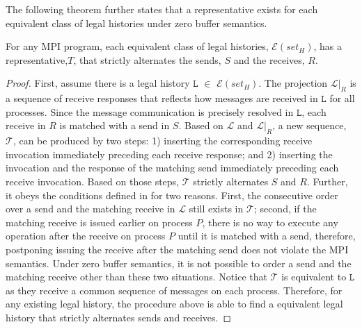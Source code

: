 The following theorem further states that a representative exists for each equivalent class of legal histories under zero buffer semantics. 

\begin{theorem}
For any MPI program, each equivalent class of legal histories, $\mathcal{E}(\mathit{set_H})$, has a representative,$T$, that strictly alternates the sends, $S$ and the receives, $R$.
\end{theorem}

\begin{proof}
First, assume there is a legal history $\mathtt{L}$ $\in$ $\mathcal{E}(\mathit{set_H})$. The projection $\mathcal{L} | _{R}$ is a sequence of receive responses that reflects how messages are received in $\mathtt{L}$ for all processes. Since the message communication is precisely resolved in $\mathtt{L}$, each receive in $\mathit{R}$ is matched with a send in $\mathit{S}$. Based on $\mathcal{L}$ and $\mathcal{L} | _{R}$, a new sequence, $\mathcal{T}$, can be produced by two steps: 1) inserting the corresponding receive invocation immediately preceding each receive response; and 2) inserting the invocation and the response of the matching send immediately preceding each receive invocation. Based on those steps, $\mathcal{T}$ strictly alternates $S$ and $R$. Further, it obeys the conditions defined in  for two reasons. First, the consecutive order over a send and the matching receive in $\mathcal{L}$ still exists in $\mathcal{T}$; second, if the matching receive is issued earlier on process $P$, there is no way to execute any operation after the receive on process $P$ until it is matched with a send, therefore, postponing issuing the receive after the matching send does not violate the MPI semantics. Under zero buffer semantics, it is not possible to order a send and the matching receive other than these two situations. Notice that $\mathcal{T}$ is equivalent to $\mathtt{L}$ as they receive a common sequence of messages on each process. Therefore, for any existing legal history, the procedure above is able to find a equivalent legal history that strictly alternates sends and receives. 
\end{proof}

